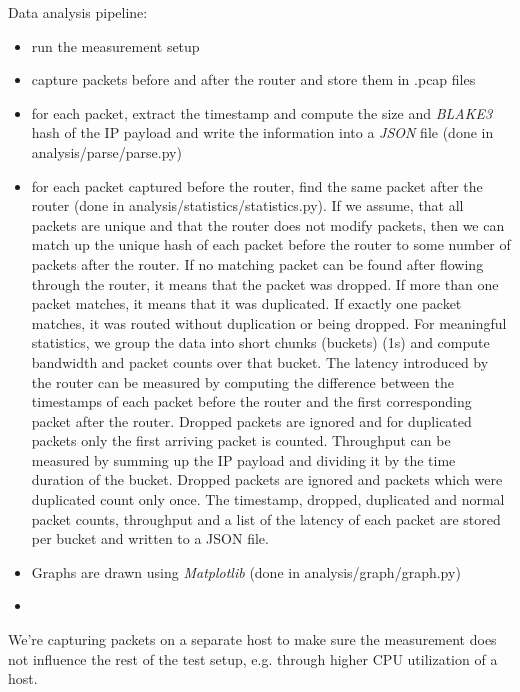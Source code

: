 Data analysis pipeline:
\begin{itemize}
  \item run the measurement setup
  \item capture packets before and after the router and store them in .pcap files
  \item for each packet, extract the timestamp and compute the size and \textit{BLAKE3} \cite{wiki:BLAKE3} hash of the IP payload and write the information into a \textit{JSON} \cite{wiki:JSON} file (done in analysis/parse/parse.py)
  \item for each packet captured before the router, find the same packet after the router (done in analysis/statistics/statistics.py). If we assume, that all packets are unique and that the router does not modify packets, then we can match up the unique hash of each packet before the router to some number of packets after the router. If no matching packet can be found after flowing through the router, it means that the packet was dropped. If more than one packet matches, it means that it was duplicated. If exactly one packet matches, it was routed without duplication or being dropped. For meaningful statistics, we group the data into short chunks (buckets) (1s) and compute bandwidth and packet counts over that bucket. The latency introduced by the router can be measured by computing the difference between the timestamps of each packet before the router and the first corresponding packet after the router. Dropped packets are ignored and for duplicated packets only the first arriving packet is counted. Throughput can be measured by summing up the IP payload  and dividing it by the time duration of the bucket. Dropped packets are ignored and packets which were duplicated count only once. The timestamp, dropped, duplicated and normal packet counts, throughput and a list of the latency of each packet are stored per bucket and written to a JSON file.
  \item Graphs are drawn using \textit{Matplotlib} \cite{Matplotlib} (done in analysis/graph/graph.py)
  \item {}
\end{itemize}


We're capturing packets on a separate host to make sure the measurement does not influence the rest of the test setup, e.g. through higher CPU utilization of a host.

